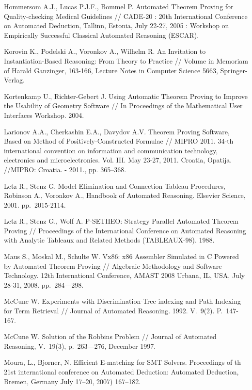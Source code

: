 \begin{thebibliography}{99}
 Hommersom A.J., Lucas P.J.F., Bommel P. Automated Theorem Proving for Quality-checking Medical Guidelines // CADE-20 : 20th International Conference on Automated Deduction, Tallinn, Estonia, July 22-27, 2005 : Workshop on Empirically Successful Classical Automated Reasoning (ESCAR).


 Korovin K., Podelski A., Voronkov A., Wilhelm R. An Invitation to Instantiation-Based Reasoning: From Theory to Practice // Volume in Memoriam of Harald Ganzinger, 163-166, Lecture Notes in Computer Science 5663, Springer-Verlag.

 Kortenkamp U., Richter-Gebert J. Using Automatic Theorem Proving to Improve the Usability of Geometry Software // In Proceedings of the Mathematical User Interfaces Workshop. 2004.


  Larionov A.A., Cherkashin E.A., Davydov A.V. Theorem Proving Software, Based on Method of Positively-Constructed Formulae // MIPRO 2011. 34-th international convention on information and communication technology, electronics and microelectronics. Vol. III. May 23-27, 2011. Croatia, Opatija. //MIPRO: Croatia. - 2011., pp. 365--368.

 Letz R., Stenz G. Model Elimination and Connection Tableau Procedures, Robinson A., Voronkov A., Handbook of Automated Reasoning. Elsevier Science, 2001. pp.~2015-2114.

  Letz R., Stenz G., Wolf A. P-SETHEO: Strategy Parallel Automated Theorem Proving // Proceedings of the International Conference on Automated Reasoning with Analytic Tableaux and Related Methods (TABLEAUX-98). 1988.

 Maus S., Moskal M., Schulte W. Vx86: x86 Assembler Simulated in C Powered by Automated Theorem Proving // Algebraic Methodology and Software Technology. 12th International Conference, AMAST 2008 Urbana, IL, USA, July 28-31, 2008. pp.~284---298.

 McCune W. Experiments with Discrimination-Tree indexing and Path Indexing for Term Retrieval // Journal of Automated Reasoning. 1992. V.~9(2). P.~147-167.

 McCune W. Solution of the Robbins Problem // Journal of Automated Reasoning, V.~19(3), p.~263---276, December 1997.

 Moura, L., Bjorner, N. Efficient E-matching for SMT Solvers. Proceedings of th 21st international conference on Automated Deduction: Automated Deduction, Bremen, Germany July 17--20, 2007) 167--182.


\end{thebibliography}
